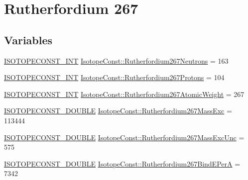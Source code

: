 \hypertarget{group___isotope_const-_rutherfordium-_rf267}{}\section{Rutherfordium 267}
\label{group___isotope_const-_rutherfordium-_rf267}
\subsection*{Variables}
\begin{DoxyCompactItemize}
\item 
\mbox{\hyperlink{group___isotope_const-_macros_ga5f18360b3e99483a35c32d789e62621c}{I\+S\+O\+T\+O\+P\+E\+C\+O\+N\+S\+T\+\_\+\+I\+NT}} \mbox{\hyperlink{group___isotope_const-_rutherfordium-_rf267_ga76c5cb625ec39455ed3629c70caba364}{Isotope\+Const\+::\+Rutherfordium267\+Neutrons}} = 163
\item 
\mbox{\hyperlink{group___isotope_const-_macros_ga5f18360b3e99483a35c32d789e62621c}{I\+S\+O\+T\+O\+P\+E\+C\+O\+N\+S\+T\+\_\+\+I\+NT}} \mbox{\hyperlink{group___isotope_const-_rutherfordium-_rf267_ga05074e8293d793b987bfc74b4015ac0e}{Isotope\+Const\+::\+Rutherfordium267\+Protons}} = 104
\item 
\mbox{\hyperlink{group___isotope_const-_macros_ga5f18360b3e99483a35c32d789e62621c}{I\+S\+O\+T\+O\+P\+E\+C\+O\+N\+S\+T\+\_\+\+I\+NT}} \mbox{\hyperlink{group___isotope_const-_rutherfordium-_rf267_ga5008288ff978cd418dd08e91c6af225e}{Isotope\+Const\+::\+Rutherfordium267\+Atomic\+Weight}} = 267
\item 
\mbox{\hyperlink{group___isotope_const-_macros_ga8f45a7272ce02c0b4c65c44636ed719a}{I\+S\+O\+T\+O\+P\+E\+C\+O\+N\+S\+T\+\_\+\+D\+O\+U\+B\+LE}} \mbox{\hyperlink{group___isotope_const-_rutherfordium-_rf267_gaf36e4e20044ea66ae6f69b3e1996a544}{Isotope\+Const\+::\+Rutherfordium267\+Mass\+Exc}} = 113444
\item 
\mbox{\hyperlink{group___isotope_const-_macros_ga8f45a7272ce02c0b4c65c44636ed719a}{I\+S\+O\+T\+O\+P\+E\+C\+O\+N\+S\+T\+\_\+\+D\+O\+U\+B\+LE}} \mbox{\hyperlink{group___isotope_const-_rutherfordium-_rf267_ga8072934e9f495afc1e87cdd363f7393c}{Isotope\+Const\+::\+Rutherfordium267\+Mass\+Exc\+Unc}} = 575
\item 
\mbox{\hyperlink{group___isotope_const-_macros_ga8f45a7272ce02c0b4c65c44636ed719a}{I\+S\+O\+T\+O\+P\+E\+C\+O\+N\+S\+T\+\_\+\+D\+O\+U\+B\+LE}} \mbox{\hyperlink{group___isotope_const-_rutherfordium-_rf267_gac35deeaa97389e9b925264c37c3a93b5}{Isotope\+Const\+::\+Rutherfordium267\+Bind\+E\+PerA}} = 7342

\end{DoxyCompactItemize}
